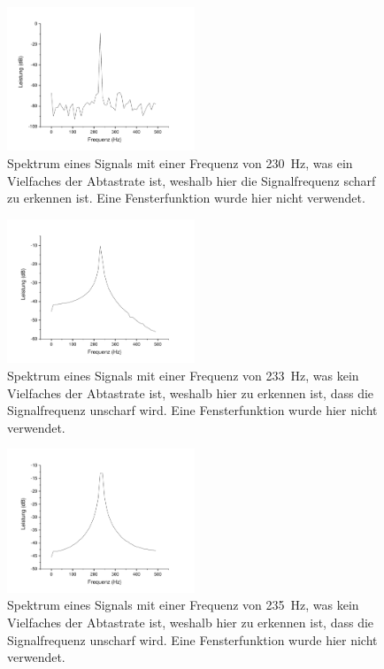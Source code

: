 \documentclass[
a4paper,
12pt,
pagesize,
ngerman
]{scrartcl}
\begin{document}
	\begin{figure}[H]  
		\includegraphics[width=0.5\textwidth]{Origin-Files/unpassend_230nonhann}
		\centering
		\caption{
			Spektrum eines Signals mit einer Frequenz von \SI{230}{\hertz}, was ein Vielfaches der Abtastrate ist, weshalb hier die Signalfrequenz scharf zu erkennen ist. Eine Fensterfunktion wurde hier nicht verwendet.
		}
		\label{fig_tag3_unpassend_230hz}
		\centering
	\end{figure}
	
	\begin{figure}[H]  
		\includegraphics[width=0.5\textwidth]{Origin-Files/unpassend_233nonhann}
		\centering
		\caption{
			Spektrum eines Signals mit einer Frequenz von \SI{233}{\hertz}, was kein Vielfaches der Abtastrate ist, weshalb hier zu erkennen ist, dass die Signalfrequenz unscharf wird. Eine Fensterfunktion wurde hier nicht verwendet.
		}
		\label{fig_tag3_unpassend_233hz}
		\centering
	\end{figure}
	
	\begin{figure}[H]  
		\includegraphics[width=0.5\textwidth]{Origin-Files/unpassend_235nonhann}
		\centering
		\caption{
			Spektrum eines Signals mit einer Frequenz von \SI{235}{\hertz}, was kein Vielfaches der Abtastrate ist, weshalb hier zu erkennen ist, dass die Signalfrequenz unscharf wird. Eine Fensterfunktion wurde hier nicht verwendet.
		}
		\label{fig_tag3_unpassend_235hz}
		\centering
	\end{figure}
	
\end{document}
